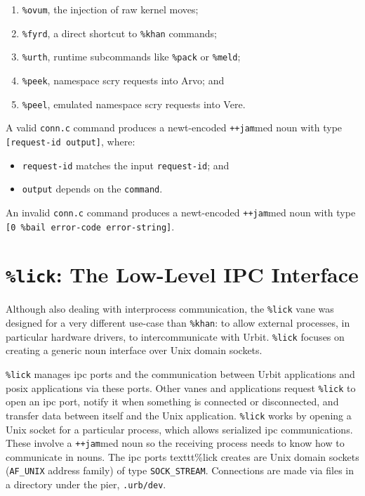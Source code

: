 \documentclass[twoside]{article}
\begin{document}
\begin{enumerate}
  \item \texttt{\%ovum}, the injection of raw kernel moves;
  \item \texttt{\%fyrd}, a direct shortcut to \texttt{\%khan} commands;
  \item \texttt{\%urth}, runtime subcommands like \texttt{\%pack} or \texttt{\%meld};
  \item \texttt{\%peek}, namespace scry requests into Arvo; and
  \item \texttt{\%peel}, emulated namespace scry requests into Vere.
\end{enumerate}
\noindent
A valid \texttt{conn.c} command produces a newt-encoded \lstinline[style=inlinecode]{++jam}med noun with type \lstinline[style=inlinecode]{[request-id output]}, where:
\begin{itemize}
  \item \texttt{request-id} matches the input \texttt{request-id}; and
  \item \texttt{output} depends on the \texttt{command}.
\end{itemize}
\noindent
An invalid \texttt{conn.c} command produces a newt-encoded \lstinline[style=inlinecode]{++jam}med noun with type \texttt{[0 \%bail error-code error-string]}. 


\section[{\texttt{\%lick}:  The Low-Level {\sc ipc} Interface}]{\texttt{\%lick}:  The Low-Level IPC Interface}

Although also dealing with interprocess communication, the \texttt{\%lick} vane \citep{UIP-0101} was designed for a very different use-case than \texttt{\%khan}:  to allow external processes, in particular hardware drivers, to intercommunicate with Urbit.  \texttt{\%lick} focuses on creating a generic noun interface over Unix domain sockets.

\texttt{\%lick} manages {\sc ipc} ports and the communication between Urbit applications and {\sc posix} applications via these ports.  Other vanes and applications request \texttt{\%lick} to open an {\sc ipc} port, notify it when something is connected or disconnected, and transfer data between itself and the Unix application.  \texttt{\%lick} works by opening a Unix socket for a particular process, which allows serialized {\sc ipc} communications.  These involve a \lstinline[style=inlinecode]{++jam}med noun so the receiving process needs to know how to communicate in nouns.  The {\sc ipc} ports texttt{\%lick} creates are Unix domain sockets (\texttt{AF\_UNIX} address family) of type \texttt{SOCK\_STREAM}.  Connections are made via files in a directory under the pier, \texttt{.urb/dev}.
\end{document}
